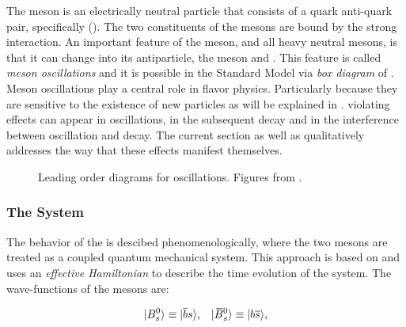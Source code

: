 The \Bs meson is an electrically neutral particle that consists of a quark anti-quark pair, specifically (\bquarkbar\squark).
The two constituents of the mesons are bound by the strong interaction. An important feature of
the \Bs meson, and all heavy neutral mesons, is that it can change into its antiparticle,
the \Bsb meson and \viceversa. This feature is called {\it meson oscillations} and it is possible
in the Standard Model via  {\it box diagram} of .
Meson oscillations play a central role in flavor physics. Particularly because they are sensitive to the
existence of new particles as will be explained in . \CP violating effects can
appear in \BBbarSyst oscillations, in the subsequent decay and in the interference between oscillation
and decay. The current section as well as  qualitatively addresses the way that
these effects manifest themselves.

\begin{figure}[!h]
  \centering
  \begin{subfigure}{0.5\textwidth}
    \centering
    \raggedright
    \scalebox{0.9}{\sffamily }
    \caption{}
    \label{bs_box_1}
  \end{subfigure}%
  \hfill%
  \begin{subfigure}{0.5\textwidth}
    \centering
    \raggedleft
    \scalebox{0.9}{\sffamily }
    \caption{}
    \label{bs_box_2}
  \end{subfigure}
  \caption{Leading order diagrams for \BBbarSyst oscillations. Figures from \cite{jeroenThesis}.}
  \label{bs_box}
\end{figure}

\subsubsection{The \BBbarSyst System}
\label{the_bbar_system}

The behavior of the \BBbarSyst is descibed phenomenologically, where the two mesons are treated as a
coupled quantum mechanical system. This approach
is based on \cite{Weisskopf:1930au,Weisskopf:1930ps} and uses an {\it effective Hamiltonian}
\cite{eff-hamiltonian-bs-syst,DeBruyn-thesis} to describe the time evolution of the system.
The wave-functions of the mesons are:

\begin{equation}
  \centering
  \ket{\Bs}  \equiv  \ket{\bquarkbar\squark}, \;\;\; \ket{\Bsb} \equiv  \ket{\bquark\squarkbar},
  \label{bs_wavefunctions}
\end{equation}

